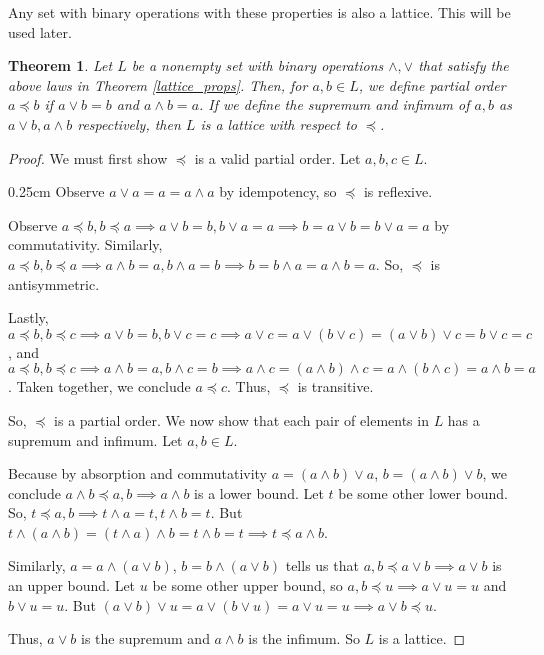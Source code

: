 \documentclass[10pt, letterpaper]{article}
\newenvironment{tabOver}[1]
{\begin{adjustwidth}{#1cm}{}}{\end{adjustwidth}}
\newtheorem{theorem}{Theorem}
\theoremstyle{definition}
\begin{document}
Any set with binary operations with these properties is also a lattice.
This will be used later.
\begin{theorem}\label{set_to_lattice}
	Let \(L\) be a nonempty set with binary operations \(\wedge, \vee\) that
	satisfy the above laws in Theorem \ref{lattice_props}. Then, for \(a,b\in L\),
	we define partial order \(a\preceq b\) if \(a\vee b=b\) and \(a\wedge b = a\).
	If we define the supremum and infimum of \(a,b\) as \(a\vee b, a\wedge b\) respectively,
	then \(L\) is a lattice with respect to \(\preceq\).
\end{theorem}
\begin{proof}
	We must first show \(\preceq\) is a valid partial order. Let \(a,b,c\in L\).
	\begin{tabOver}{0.25}
		Observe \(a\vee a=a=a\wedge a\) by idempotency, so \(\preceq\) is reflexive.

		Observe \(a\preceq b, b\preceq a\implies a\vee b = b, b\vee a = a\implies
		b=a\vee b = b\vee a = a\) by commutativity. Similarly,
		\(a\preceq b, b\preceq a\implies a\wedge b = a, b\wedge a = b\implies
		b=b\wedge a=a\wedge b = a\).
		So, \(\preceq\) is antisymmetric.

		Lastly, \(a\preceq b, b\preceq c\implies a\vee b = b, b\vee c = c\implies
		a\vee c = a\vee (b\vee c)=(a\vee b)\vee c=b\vee c=c\),
		and \(a\preceq b, b\preceq c\implies a\wedge b = a, b\wedge c = b\implies
		a\wedge c = (a\wedge b)\wedge c = a\wedge(b\wedge c)=a\wedge b=a\).
		Taken together, we conclude \(a\preceq c\).
		Thus, \(\preceq\) is transitive.
\end{tabOver}
	So, \(\preceq\) is a partial order. We now show that each pair of elements in
	\(L\) has a supremum and infimum. Let \(a,b\in L\).

	Because by absorption and commutativity \(a=(a\wedge b)\vee a\),
	\(b=(a\wedge b)\vee b\), we conclude \(a\wedge b\preceq a, b\implies a\wedge b\)
	is a lower bound. Let \(t\) be some other lower bound. So, \(t\preceq a, b\implies
	t\wedge a = t, t\wedge b = t\).
	But \(t\wedge(a\wedge b)=(t\wedge a)\wedge b=t\wedge b=t\implies t\preceq a\wedge b\).
	
	Similarly, \(a=a\wedge( a\vee b)\), \(b=b\wedge( a\vee b)\) tells us that
	\(a,b\preceq a\vee b\implies a\vee b\) is an upper bound. Let \(u\) be some other
	upper bound, so \(a,b\preceq u\implies a\vee u = u\) and \(b\vee u = u\).
	But \((a\vee b)\vee u = a\vee(b\vee u)=a\vee u = u\implies a\vee b\preceq u\).

	Thus, \(a\vee b\) is the supremum and \(a\wedge b\) is the infimum. So \(L\) is a lattice.
	
\end{proof}
\end{document}

